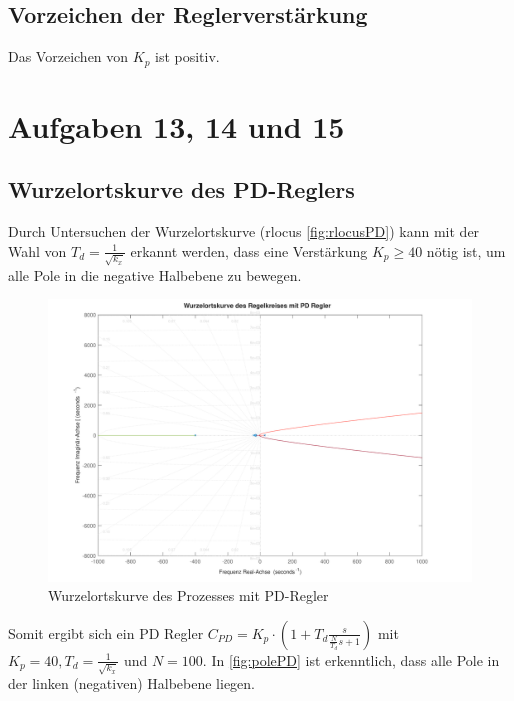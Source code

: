 	\subsection*{Vorzeichen der Reglerverstärkung}
	Das Vorzeichen von $K_{p}$ ist positiv.

\section{Aufgaben 13, 14 und 15}\label{sec:Aufgabe13_14}
	\subsection*{Wurzelortskurve des PD-Reglers}
	Durch Untersuchen der Wurzelortskurve (rlocus \autoref{fig:rlocusPD})  kann mit der Wahl von $T_d = \frac{1}{\sqrt{k_x}}$ erkannt werden, dass eine Verstärkung $K_p \geq 40$ nötig ist, um alle Pole in die negative Halbebene zu bewegen.
	\begin{figure}[H]
				\centering
				\includegraphics[width=.9\textwidth]{./figure/rlocus_pd_untuned.pdf}
				\caption{Wurzelortskurve des Prozesses mit PD-Regler}
				\label{fig:rlocusPD}
			\end{figure}


			Somit ergibt sich ein PD Regler $C_{PD} = K_p \cdot \left(  1 + T_d \frac{s}{\frac{N}{T_d}s + 1} \right)$ mit $K_p=40, T_d = \frac{1}{\sqrt{k_x}}$ und $N=100$.
			\newpage
			In \autoref{fig:polePD} ist erkenntlich, dass alle Pole in der linken (negativen) Halbebene liegen.

